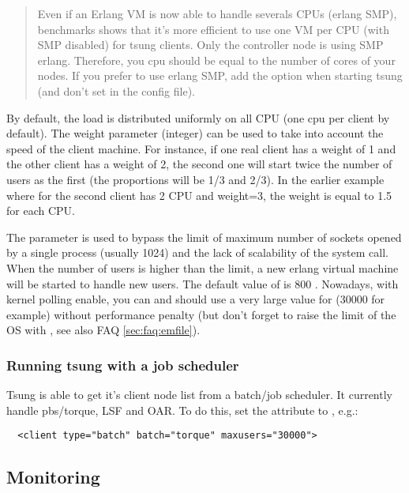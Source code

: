 \documentclass{TSUNG-en}
\begin{document}
 \begin{quote}
  Even if an Erlang VM is now able to handle severals CPUs
 (erlang SMP), benchmarks shows that it's more efficient to use one VM
 per CPU (with SMP disabled) for tsung clients. Only the controller node is using SMP
 erlang. Therefore, you cpu should be equal to the number of cores of
 your nodes. If you prefer to use erlang SMP, add the 
 option when starting tsung (and don't set  in the config
 file).
 \end{quote}

 By default, the load is distributed uniformly on all CPU (one cpu
 per client by default). The weight parameter (integer) can be used to
 take into account the speed of the client machine. For instance, if
 one real client has a weight of 1 and the other client has a weight
 of 2, the second one will start twice the number of users as the
 first (the proportions will be 1/3 and 2/3). In the earlier example
 where for the second client has 2 CPU and weight=3, the weight is
 equal to 1.5 for each CPU.

 The  parameter is used to bypass the limit of
 maximum number of sockets opened by a single process (usually 1024)
 and the lack of scalability of the  system call. When
 the number of users is higher than the limit, a new erlang virtual
 machine will be started to handle new users. The default value of
  is 800 . Nowadays, with kernel polling enable, you
 can and should use a very large value for  (30000 for example) without
 performance penalty (but don't forget to raise the limit of the OS with
 , see also FAQ \ref{sec:faq:emfile}).

\subsubsection{Running tsung with a job scheduler}

Tsung is able to get it's client node list from a batch/job
scheduler. It currently handle pbs/torque, LSF and OAR. To do this,
 set the  attribute to , e.g.:

\begin{Verbatim}
  <client type="batch" batch="torque" maxusers="30000">
\end{Verbatim}



\subsection{Monitoring}
\end{document}
